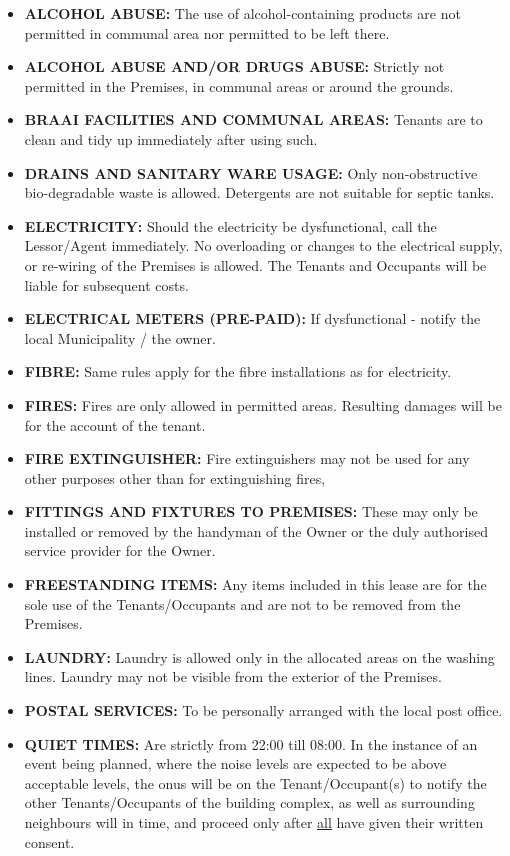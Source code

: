 \documentclass[11pt]{article}
\begin{document}
\begin{itemize}
	\item \textbf{\uppercase{alcohol abuse:}} The use of alcohol-containing products are not permitted in communal area nor permitted to be left there.
	\item \textbf{\uppercase{alcohol abuse and/or drugs abuse:}} Strictly not permitted in the Premises, in communal areas or around the grounds.
	\item \textbf{\uppercase{braai facilities and communal areas:}} Tenants are to clean and tidy up immediately after using such.
	\item \textbf{\uppercase{drains and sanitary ware usage:}} Only non-obstructive bio-degradable waste is allowed. Detergents are not suitable for septic tanks.
	\item \textbf{\uppercase{electricity:}} Should the electricity be dysfunctional, call the Lessor/Agent immediately. No overloading or changes to the electrical supply, or re-wiring of the Premises is allowed. The Tenants and Occupants will be liable for subsequent costs.
	\item \textbf{\uppercase{electrical meters (pre-paid):}} If dysfunctional - notify the local Municipality / the owner.
	\item \textbf{\uppercase{fibre:}} Same rules apply for the fibre installations as for electricity.
	\item \textbf{\uppercase{fires:}} Fires are only allowed in permitted areas. Resulting damages will be for the account of the tenant.
	\item \textbf{\uppercase{fire extinguisher:}} Fire extinguishers may not be used for any other purposes other than for extinguishing fires,
	\item \textbf{\uppercase{fittings and fixtures to premises:}} These may only be installed or removed by the handyman of the Owner or the duly authorised service provider for the Owner.
	\item \textbf{\uppercase{freestanding items:}} Any items included in this lease are for the sole use of the Tenants/Occupants and are not to be removed from the Premises.
	\item \textbf{\uppercase{laundry:}} Laundry is allowed only in the allocated areas on the washing lines. Laundry may not be visible from the exterior of the Premises.
	\item \textbf{\uppercase{postal services:}} To be personally arranged with the local post office.
	\item \textbf{\uppercase{quiet times:}} Are strictly from 22:00 till 08:00. In the instance of an event being planned, where the noise levels are expected to be above acceptable levels, the onus will be on the Tenant/Occupant(s) to notify the other Tenants/Occupants of the building complex, as well as surrounding neighbours will in time, and proceed only after \underline{all} have given their written consent.

\end{itemize}
\end{document}
